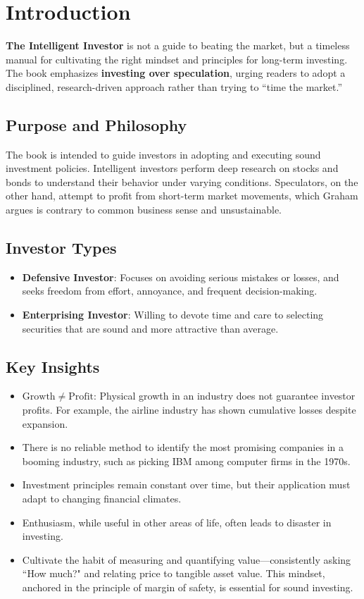 \section*{Introduction}

\textbf{The Intelligent Investor} is not a guide to beating the market, but a timeless manual for cultivating the right mindset and principles for long-term investing. The book emphasizes \textbf{investing over speculation}, urging readers to adopt a disciplined, research-driven approach rather than trying to “time the market.”

\subsection*{Purpose and Philosophy}
The book is intended to guide investors in adopting and executing sound investment policies. Intelligent investors perform deep research on stocks and bonds to understand their behavior under varying conditions. Speculators, on the other hand, attempt to profit from short-term market movements, which Graham argues is contrary to common business sense and unsustainable.

\subsection*{Investor Types}
\begin{itemize}
    \item \textbf{Defensive Investor}: Focuses on avoiding serious mistakes or losses, and seeks freedom from effort, annoyance, and frequent decision-making.
    \item \textbf{Enterprising Investor}: Willing to devote time and care to selecting securities that are sound and more attractive than average.
\end{itemize}

\subsection*{Key Insights}
\begin{itemize}
    \item \(
        \mathrm{Growth} \neq \mathrm{Profit}
    \): Physical growth in an industry does not guarantee investor profits. For example, the airline industry has shown cumulative losses despite expansion.
    \item There is no reliable method to identify the most promising companies in a booming industry, such as picking IBM among computer firms in the 1970s.
    \item Investment principles remain constant over time, but their application must adapt to changing financial climates.
    \item Enthusiasm, while useful in other areas of life, often leads to disaster in investing.
    \item Cultivate the habit of measuring and quantifying value—consistently asking “How much?" and relating price to tangible asset value. This mindset, anchored in the principle of margin of safety, is essential for sound investing.

\end{itemize}

